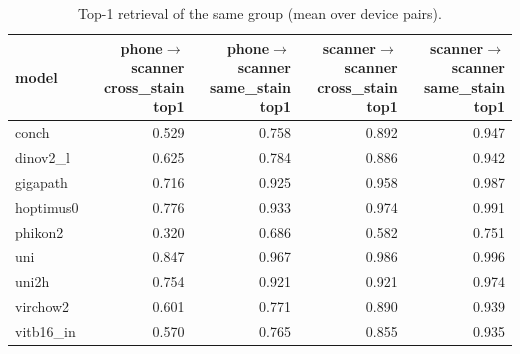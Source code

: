 \begin{table}[t]
\centering
\small
\begin{tabular}{lrrrr}
\toprule
model & phone$\to$scanner cross\_stain top1 & phone$\to$scanner same\_stain top1 & scanner$\to$scanner cross\_stain top1 & scanner$\to$scanner same\_stain top1 \\
\midrule
conch & 0.529 & 0.758 & 0.892 & 0.947 \\
dinov2\_l & 0.625 & 0.784 & 0.886 & 0.942 \\
gigapath & 0.716 & 0.925 & 0.958 & 0.987 \\
hoptimus0 & 0.776 & 0.933 & 0.974 & 0.991 \\
phikon2 & 0.320 & 0.686 & 0.582 & 0.751 \\
uni & 0.847 & 0.967 & 0.986 & 0.996 \\
uni2h & 0.754 & 0.921 & 0.921 & 0.974 \\
virchow2 & 0.601 & 0.771 & 0.890 & 0.939 \\
vitb16\_in & 0.570 & 0.765 & 0.855 & 0.935 \\
\bottomrule
\end{tabular}
\caption{Top-1 retrieval of the same group (mean over device pairs).}
\label{tab:retrieval}
\end{table}
